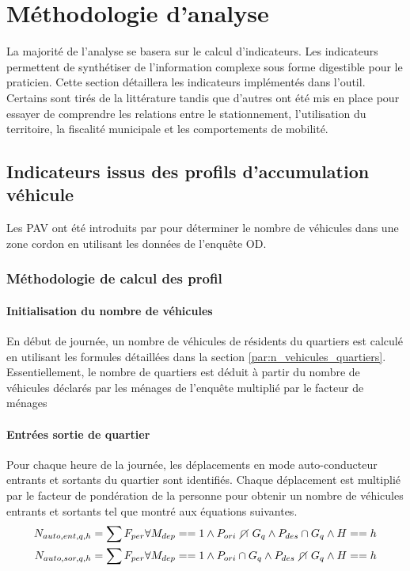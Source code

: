 \section{Méthodologie d'analyse} \label{sec:meth_analyse}
    La majorité de l'analyse se basera sur le calcul d'indicateurs. Les indicateurs permettent de synthétiser de l'information complexe sous forme digestible pour le praticien. Cette section détaillera les indicateurs implémentés dans l'outil. Certains sont tirés de la littérature tandis que d'autres ont été mis en place pour essayer de comprendre les relations entre le stationnement, l'utilisation du territoire, la fiscalité municipale et les comportements de mobilité.
    \subsection{Indicateurs issus des profils d'accumulation véhicule}
    Les \ac{PAV} ont été introduits par \textcite{morency_characterizing_2008} pour déterminer le nombre de véhicules dans une zone cordon en utilisant les données de l'enquête OD. 
        \subsubsection{Méthodologie de calcul des profil}
            \paragraph{Initialisation du nombre de véhicules} En début de journée, un nombre de véhicules de résidents du quartiers est calculé en utilisant les formules détaillées dans la section \ref{par:n_vehicules_quartiers}. Essentiellement, le nombre de quartiers est déduit à partir du nombre de véhicules déclarés par les ménages de l'enquête multiplié par le facteur de ménages
            \paragraph{Entrées sortie de quartier} Pour chaque heure de la journée, les déplacements en mode auto-conducteur entrants et sortants du quartier sont identifiés. Chaque déplacement est multiplié par le facteur de pondération de la personne pour obtenir un nombre de véhicules entrants et sortants tel que montré aux équations suivantes.
            \begin{align}
                N_{auto,ent,q,h} &= \sum{F_{per}}\forall M_{dep} == 1 \wedge P_{ori} \disjoint G_q \wedge P_{des} \cap G_q \wedge H==h\\
                N_{auto,sor,q,h} &= \sum{F_{per}} \forall M_{dep} == 1 \wedge P_{ori} \cap G_q \wedge P_{des} \disjoint G_q \wedge H==h
            \end{align}
